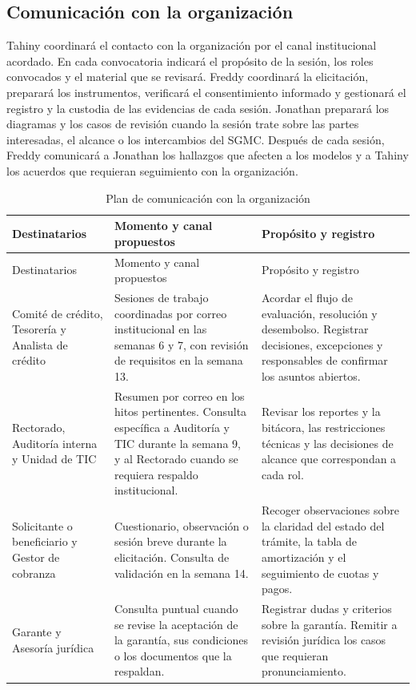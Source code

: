 \documentclass[11pt,a4paper]{article}
\begin{document}
\subsection{Comunicación con la organización}

Tahiny coordinará el contacto con la organización por el canal
institucional acordado. En cada convocatoria indicará el propósito
de la sesión, los roles convocados y el material que se revisará.
Freddy coordinará la elicitación, preparará los instrumentos,
verificará el consentimiento informado y gestionará el registro
y la custodia de las evidencias de cada sesión. Jonathan preparará
los diagramas y los casos de revisión cuando la sesión trate sobre
las partes interesadas, el alcance o los intercambios del SGMC.
Después de cada sesión, Freddy comunicará a Jonathan los hallazgos
que afecten a los modelos y a Tahiny los acuerdos que requieran
seguimiento con la organización.

\begingroup
\small
\setlength{\tabcolsep}{4pt}
\begin{longtable}{@{}L{.24}L{.33}L{.37}@{}}
\caption{Plan de comunicación con la organización}\label{tab:comunicacion}\\
\toprule
Destinatarios & Momento y canal propuestos & Propósito y registro \\
\midrule
\endfirsthead
\toprule
Destinatarios & Momento y canal propuestos & Propósito y registro \\
\midrule
\endhead
\bottomrule
\endfoot

Comité de crédito, Tesorería y Analista de crédito
& Sesiones de trabajo coordinadas por correo institucional en las
semanas 6 y 7, con revisión de requisitos en la semana 13.
& Acordar el flujo de evaluación, resolución y desembolso.
Registrar decisiones, excepciones y responsables de confirmar los
asuntos abiertos. \\
\addlinespace

Rectorado, Auditoría interna y Unidad de TIC
& Resumen por correo en los hitos pertinentes. Consulta específica
a Auditoría y TIC durante la semana 9, y al Rectorado cuando se
requiera respaldo institucional.
& Revisar los reportes y la bitácora, las restricciones técnicas
y las decisiones de alcance que correspondan a cada rol. \\
\addlinespace

Solicitante o beneficiario y Gestor de cobranza
& Cuestionario, observación o sesión breve durante la elicitación.
Consulta de validación en la semana 14.
& Recoger observaciones sobre la claridad del estado del trámite,
la tabla de amortización y el seguimiento de cuotas y pagos. \\
\addlinespace

Garante y Asesoría jurídica
& Consulta puntual cuando se revise la aceptación de la garantía,
sus condiciones o los documentos que la respaldan.
& Registrar dudas y criterios sobre la garantía. Remitir a
revisión jurídica los casos que requieran pronunciamiento. \\

\end{longtable}
\endgroup
\end{document}
